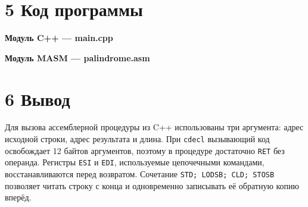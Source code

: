 \documentclass[12pt,a4paper]{article}
\begin{document}
\section*{5 Код программы}
\noindent\textbf{Модуль C++ --- main.cpp}


\newpage
\noindent\textbf{Модуль MASM --- palindrome.asm}


\section*{6 Вывод}
Для вызова ассемблерной процедуры из C++ использованы три аргумента:
адрес исходной строки, адрес результата и длина. При \texttt{cdecl}
вызывающий код освобождает 12 байтов аргументов, поэтому в процедуре
достаточно \texttt{RET} без операнда. Регистры \texttt{ESI} и \texttt{EDI},
используемые цепочечными командами, восстанавливаются перед возвратом.
Сочетание \texttt{STD; LODSB; CLD; STOSB} позволяет читать строку
с конца и одновременно записывать её обратную копию вперёд.
\end{document}
